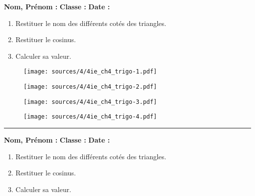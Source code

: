 \documentclass[10pt]{article}
\newcommand{\horrule}[1]{\rule{\linewidth}{#1}} %
\newcommand{\Pointille}[1][3]{\multido{}{#1}{ \makebox[\linewidth]{\dotfill}\\[\parskip]}}
\begin{document}
\textbf{Nom, Prénom :} \hspace{8cm} \textbf{Classe :} \hspace{3cm} \textbf{Date :}\\

\begin{multicols}{2}
\begin{enumerate}
\item[1.] Restituer le nom des différents cotés des triangles.
\item[2.] Restituer le cosinus.
\item[3.] Calculer sa valeur.
\end{enumerate}
\end{multicols}

\setlength{\columnseprule}{1pt}
\begin{multicols}{4}

  \begin{figure}[H]
    \centering
    \texttt{[image: sources/4/4ie\_ch4\_trigo-1.pdf]}
  \end{figure}


  \begin{figure}[H]
    \centering
    \texttt{[image: sources/4/4ie\_ch4\_trigo-2.pdf]}
  \end{figure}


  \begin{figure}[H]
    \centering
    \texttt{[image: sources/4/4ie\_ch4\_trigo-3.pdf]}
  \end{figure}


  \begin{figure}[H]
    \centering
    \texttt{[image: sources/4/4ie\_ch4\_trigo-4.pdf]}
  \end{figure}

\end{multicols}

\Pointille[6]

\horrule{0.1ex}
\vspace{0.3cm}

\textbf{Nom, Prénom :} \hspace{8cm} \textbf{Classe :} \hspace{3cm} \textbf{Date :}\\


\setlength{\columnseprule}{0pt}
\begin{multicols}{2}
\begin{enumerate}
\item[1.] Restituer le nom des différents cotés des triangles.
\item[2.] Restituer le cosinus.
\item[3.] Calculer sa valeur.
\end{enumerate}
\end{multicols}
\end{document}
